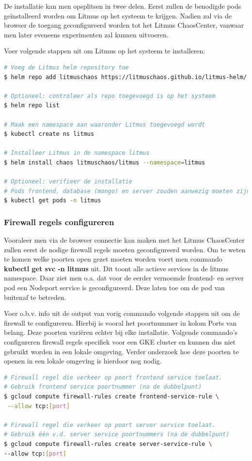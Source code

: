 De installatie kan men opsplitsen in twee delen. Eerst zullen de benodigde pods geïnstalleerd worden om Litmus op het systeem te krijgen. Nadien zal via de browser de toegang geconfigureerd worden tot het Litmus ChaosCenter, vanwaar men later eveneens experimenten zal kunnen uitvoeren. 

Voer volgende stappen uit om Litmus op het systeem te installeren:
\begin{lstlisting}[language=bash]
# Voeg de Litmus helm repository toe 
$ helm repo add litmuschaos https://litmuschaos.github.io/litmus-helm/

# Optioneel: controleer als repo toegevoegd is op het systeem
$ helm repo list

# Maak een namespace aan waaronder Litmus toegevoegd wordt
$ kubectl create ns litmus

# Installeer Litmus in de namespace litmus
$ helm install chaos litmuschaos/litmus --namespace=litmus

# Optioneel: verifieer de installatie
# Pods frontend, database (mongo) en server zouden aanwezig moeten zijn.
$ kubectl get pods -n litmus
\end{lstlisting}

\subsubsection{Firewall regels configureren}

Vooraleer men via de browser connectie kan maken met het Litmus ChaosCenter zullen eerst de nodige firewall regels moeten geconfigureerd worden. Om te weten te komen welke poorten open gezet moeten worden voert men commando {\bf kubectl get svc -n litmus} uit. \newline Dit toont alle actieve services in de litmus namespace. Daar ziet men o.a. dat voor de eerder vernoemde frontend- en server pod een Nodeport service is geconfigureerd. Deze laten toe om de pod van buitenaf te betreden. 

Voer o.b.v. info uit de output van vorig commando volgende stappen uit om de firewall te configureren. Hierbij is vooral het poortnummer in kolom Ports van belang. Deze poorten variëren echter bij elke installatie. Volgende commando's configureren firewall regels specifiek voor een GKE cluster en kunnen dus niet gebruikt worden in een lokale omgeving. Verder onderzoek hoe deze poorten te openen in een lokale omgeving is hierdoor nog nodig.  
\begin{lstlisting}[language=bash]
# Firewall regel die verkeer op poort frontend service toelaat.
# Gebruik frontend service poortnummer (na de dubbelpunt) 
$ gcloud compute firewall-rules create frontend-service-rule \
 --allow tcp:[port]

# Firewall regel die verkeer op poort server service toelaat. 
# Gebruik één v.d. server service poortnummers (na de dubbelpunt) 
$ gcloud compute firewall-rules create server-service-rule \
--allow tcp:[port]
\end{lstlisting}

